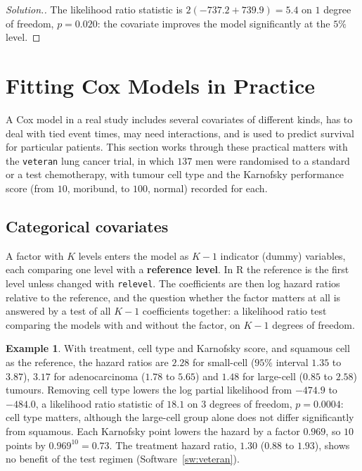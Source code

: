 \documentclass[11pt,a4paper]{article}
\numberwithin{equation}{section}
\theoremstyle{definition}
\newtheorem{exa}[thm]{Example}
\newenvironment{solution}
  {\renewcommand{\qedsymbol}{}\begin{proof}[\textit{Solution}.]}
  {\end{proof}}
\begin{document}
\begin{solution}
The likelihood ratio statistic is $2(-737.2 + 739.9) = 5.4$ on $1$ degree of freedom, $p = 0.020$: the covariate improves the model significantly at the $5\%$ level.
\end{solution}

\section{Fitting Cox Models in Practice}
\label{sec:coxfit}

A Cox model in a real study includes several covariates of different kinds, has to deal with tied event times, may need interactions, and is used to predict survival for particular patients. This section works through these practical matters with the \texttt{veteran} lung cancer trial, in which $137$ men were randomised to a standard or a test chemotherapy, with
tumour cell type and the Karnofsky performance score (from $10$, moribund, to $100$, normal) recorded for each.

\subsection{Categorical covariates}
\label{ssec:categorical}

A factor with $K$ levels enters the model as $K - 1$ indicator (dummy) variables, each comparing one level with a \textbf{reference level}. In R the reference is the first level unless changed with \texttt{relevel}. The coefficients are then log hazard ratios relative to the reference, and the question whether the factor matters at all is answered by a test of
all $K - 1$ coefficients together: a likelihood ratio test comparing the models with and without the factor, on $K - 1$ degrees of freedom.

\begin{exa}
\label{ex:veteran}
With treatment, cell type and Karnofsky score, and squamous cell as the reference, the hazard ratios are $2.28$ for small-cell ($95\%$ interval $1.35$ to $3.87$), $3.17$ for adenocarcinoma ($1.78$ to $5.65$) and $1.48$ for large-cell ($0.85$ to $2.58$) tumours. Removing cell type lowers the log partial likelihood from $-474.9$ to $-484.0$, a likelihood
ratio statistic of $18.1$ on $3$ degrees of freedom, $p = 0.0004$: cell type matters, although the large-cell group alone does not differ significantly from squamous. Each Karnofsky point lowers the hazard by a factor $0.969$, so $10$ points by $0.969^{10} = 0.73$. The treatment hazard ratio, $1.30$ ($0.88$ to $1.93$), shows no benefit of the test regimen
(Software~\ref{sw:veteran}).
\end{exa}
\end{document}
